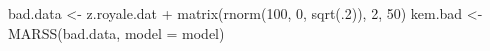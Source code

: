 \begin{Schunk}
\begin{Sinput}
 bad.data <- z.royale.dat + matrix(rnorm(100, 0, sqrt(.2)), 2, 50)
 kem.bad <- MARSS(bad.data, model = model)
\end{Sinput}
\end{Schunk}
